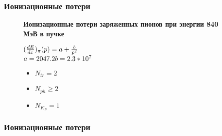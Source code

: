 \documentclass[14pt, hyperref = {colorlinks}]{beamer}
\begin{document}
\begin{frame}\label{r3}
\frametitle{Ионизационные потери}
\begin{figure}[h]
\center\textbf{Ионизационные потери заряженных пионов при энергии 840 МэВ в пучке}
\begin{minipage}[h]{0.69\linewidth}
\end{minipage}
\hfill
\begin{minipage}[h]{0.29\linewidth}
    \small{$({dE\over{dx}})_{\pi}(p) = a + {b\over{p^{2}}}$
    \\$a = 2047.2\\b = 2.3*10^{7}$}
    \begin{itemize}
        \item {$N_{tr} = 2$}
        \item {$N_{ph} \geq 2$}
        \item {$N_{K_{S}} = 1$}
    \end{itemize}
\end{minipage}
\end{figure}
\end{frame}

\begin{frame}
\frametitle{Ионизационные потери}
\begin{figure}[h]
\\
\\
 \begin{minipage}[h]{0.49\linewidth}
  \end{minipage}
  \hfill
  \begin{minipage}[h]{0.49\linewidth}
  \end{minipage}
   \small{}
\end{figure}
\end{frame}
\end{document}

